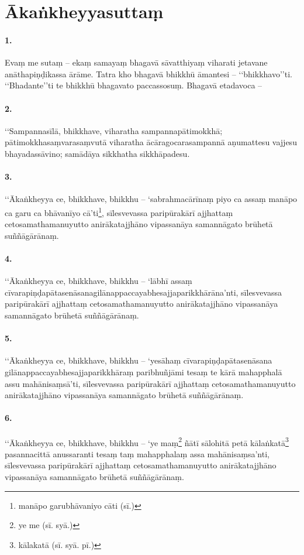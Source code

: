 \section{Ākaṅkheyyasuttaṃ}

\paragraph{1.} Evaṃ me sutaṃ – ekaṃ samayaṃ bhagavā sāvatthiyaṃ viharati jetavane anāthapiṇḍikassa ārāme. Tatra kho bhagavā bhikkhū āmantesi – ‘‘bhikkhavo’’ti. ‘‘Bhadante’’ti te bhikkhū bhagavato paccassosuṃ. Bhagavā etadavoca –

\paragraph{2.} ‘‘Sampannasīlā, bhikkhave, viharatha sampannapātimokkhā; pātimokkhasaṃvarasaṃvutā viharatha ācāragocarasampannā aṇumattesu vajjesu bhayadassāvino; samādāya sikkhatha sikkhāpadesu.

\paragraph{3.} ‘‘Ākaṅkheyya ce, bhikkhave, bhikkhu – ‘sabrahmacārīnaṃ piyo ca assaṃ manāpo ca garu ca bhāvanīyo cā’ti\footnote{manāpo garubhāvaniyo cāti (sī.)}, sīlesvevassa paripūrakārī ajjhattaṃ cetosamathamanuyutto anirākatajjhāno vipassanāya samannāgato brūhetā suññāgārānaṃ.

\paragraph{4.} ‘‘Ākaṅkheyya ce, bhikkhave, bhikkhu – ‘lābhī assaṃ cīvarapiṇḍapātasenāsanagilānappaccayabhesajjaparikkhārāna’nti, sīlesvevassa paripūrakārī ajjhattaṃ cetosamathamanuyutto anirākatajjhāno vipassanāya samannāgato brūhetā suññāgārānaṃ.

\paragraph{5.} ‘‘Ākaṅkheyya ce, bhikkhave, bhikkhu – ‘yesāhaṃ cīvarapiṇḍapātasenāsana gilānappaccayabhesajjaparikkhāraṃ paribhuñjāmi tesaṃ te kārā mahapphalā assu mahānisaṃsā’ti, sīlesvevassa paripūrakārī ajjhattaṃ cetosamathamanuyutto anirākatajjhāno vipassanāya samannāgato brūhetā suññāgārānaṃ.

\paragraph{6.} ‘‘Ākaṅkheyya ce, bhikkhave, bhikkhu – ‘ye maṃ\footnote{ye me (sī. syā.)} ñātī sālohitā petā kālaṅkatā\footnote{kālakatā (sī. syā. pī.)} pasannacittā anussaranti tesaṃ taṃ mahapphalaṃ assa mahānisaṃsa’nti, sīlesvevassa paripūrakārī ajjhattaṃ cetosamathamanuyutto anirākatajjhāno vipassanāya samannāgato brūhetā suññāgārānaṃ.

